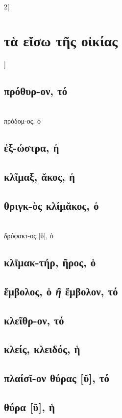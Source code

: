 \documentclass{book}
\begin{document}
\begin{multicols}{2}[\section{τὰ εἴσω τῆς οἰκίας}]
\subsection{πρόθυρ-ον, τό}
 ~\\
πρόδομ-ος, ὁ
\subsection{ἐξ-ώστρα, ἡ}
\subsection{κλῖμαξ, ᾰκος, ἡ}
\subsection{θριγκ-ὸς κλίμᾰκος, ὁ}
 ~\\
δρύφακτ-ος [ῠ], ὁ
\subsection{κλῑμακ-τήρ, ῆρος, ὁ}
\subsection{ἔμβολος, ὁ \textit{ἢ} ἔμβολον, τό}
\subsection{κλεῖθρ-ον, τό}
\subsection{κλείς, κλειδός, ἡ} 
\subsection{πλαίσῐ-ον θύρας [ῠ], τό}
\subsection{θύρα [ῠ], ἡ}
~
\end{multicols}
\newpage  
\end{document}
